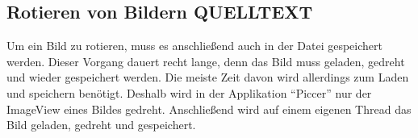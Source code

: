 \subsection{Rotieren von Bildern QUELLTEXT}
Um ein Bild zu rotieren, muss es anschließend auch in der Datei gespeichert werden.
Dieser Vorgang dauert recht lange, denn das Bild muss geladen, gedreht und wieder gespeichert werden.
Die meiste Zeit davon wird allerdings zum Laden und speichern benötigt.
Deshalb wird in der Applikation \enquote{Piccer} nur der ImageView eines Bildes gedreht.
Anschließend wird auf einem eigenen Thread das Bild geladen, gedreht und gespeichert.
